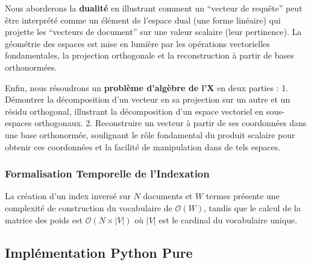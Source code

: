 \documentclass[11pt,a4paper]{report}
\begin{document}
Nous aborderons la \textbf{dualité} en illustrant comment un ``vecteur
de requête'' peut être interprété comme un élément de l'espace dual (une
forme linéaire) qui projette les ``vecteurs de document'' sur une valeur
scalaire (leur pertinence). La géométrie des espaces est mise en lumière
par les opérations vectorielles fondamentales, la projection orthogonale
et la reconstruction à partir de bases orthonormées.

Enfin, nous résoudrons un \textbf{problème d'algèbre de l'X} en deux
parties : 1. Démontrer la décomposition d'un vecteur en sa projection
sur un autre et un résidu orthogonal, illustrant la décomposition d'un
espace vectoriel en sous-espaces orthogonaux. 2. Reconstruire un vecteur
à partir de ses coordonnées dans une base orthonormée, soulignant le
rôle fondamental du produit scalaire pour obtenir ces coordonnées et la
facilité de manipulation dans de tels espaces.

\hypertarget{formalisation-temporelle-de-lindexation}{%
\subsubsection{Formalisation Temporelle de
l'Indexation}\label{formalisation-temporelle-de-lindexation}}

La création d'un index inversé sur \(N\) documents et \(W\) termes
présente une complexité de construction du vocabulaire de
\(\mathcal{O}(W)\), tandis que le calcul de la matrice des poids est
\(\mathcal{O}(N \times |V|)\) où \(|V|\) est le cardinal du vocabulaire
unique.

\hypertarget{impluxe9mentation-python-pure}{%
\subsection{Implémentation Python
Pure}\label{impluxe9mentation-python-pure}}
\end{document}
